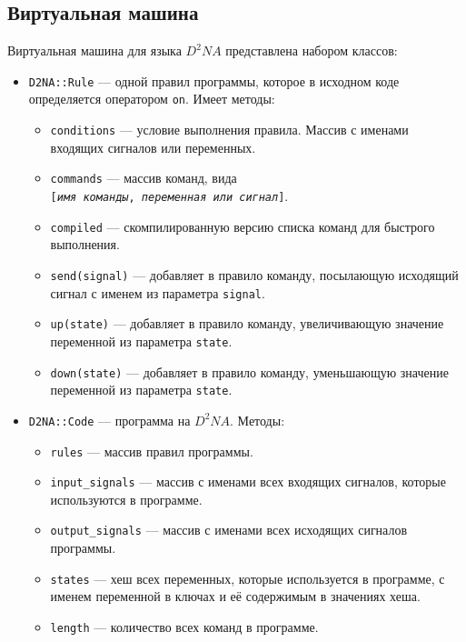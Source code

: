 \documentclass[utf8,a5paper,portrait,10pt]{eskdtext}
\begin{document}
\newpage
\subsection{Виртуальная машина}
Виртуальная машина для языка $D^2NA$ представлена набором классов:
\begin{itemize}
  \item \texttt{D2NA::Rule} — одной правил программы, которое в исходном коде
        определяется оператором \texttt{on}. Имеет методы:
        \begin{itemize}
          \item \texttt{conditions} — условие выполнения правила. Массив с
                именами входящих сигналов или переменных.
          \item \texttt{commands} — массив команд, вида\\
                \texttt{[\textit{имя команды}, \textit{переменная или сигнал}]}.
          \item \texttt{compiled} — скомпилированную версию списка команд для
                быстрого выполнения.
          \item \texttt{send(signal)} — добавляет в правило команду, посылающую
                исходящий сигнал с именем из параметра \texttt{signal}.
          \item \texttt{up(state)} — добавляет в правило команду, увеличивающую
                значение переменной из параметра \texttt{state}.
          \item \texttt{down(state)} — добавляет в правило команду, уменьшающую
                значение переменной из параметра \texttt{state}.
        \end{itemize}
  \newpage
  \item \texttt{D2NA::Code} — программа на $D^2NA$. Методы:
        \begin{itemize}
          \item \texttt{rules} — массив правил программы.
          \item \texttt{input\_signals} — массив с именами всех входящих
                сигналов, которые используются в программе.
          \item \texttt{output\_signals} — массив с именами всех исходящих
                сигналов программы.
          \item \texttt{states} — хеш всех переменных, которые используется
                в программе, с именем переменной в ключах и её содержимым в
                значениях хеша.
          \item \texttt{length} — количество всех команд в программе.

\end{itemize}
\end{itemize}
\end{document}
